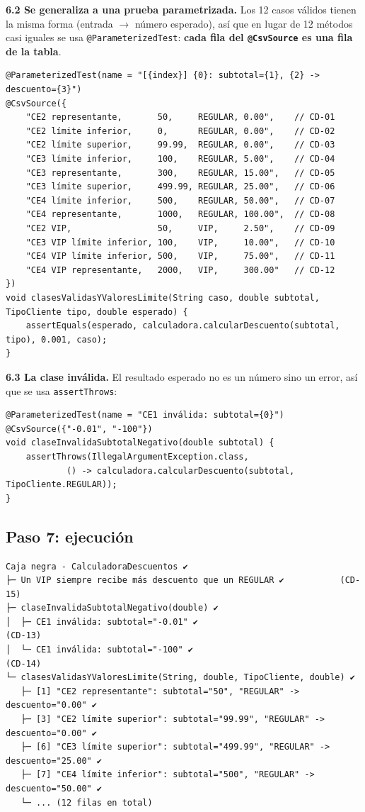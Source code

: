 \documentclass[11pt,a4paper,oneside]{report}
\newcommand{\code}[1]{\texttt{#1}}
\begin{document}
\textbf{6.2 Se generaliza a una prueba parametrizada.} Los 12 casos válidos tienen la misma forma (entrada $\rightarrow$ número esperado), así que en lugar de 12 métodos casi iguales se usa \code{@ParameterizedTest}: \textbf{cada fila del \code{@CsvSource} es una fila de la tabla}.
\begin{lstlisting}[caption={Clases válidas y límites (\code{CalculadoraDescuentosCajaNegraTest})}]
@ParameterizedTest(name = "[{index}] {0}: subtotal={1}, {2} -> descuento={3}")
@CsvSource({
    "CE2 representante,       50,     REGULAR, 0.00",    // CD-01
    "CE2 límite inferior,     0,      REGULAR, 0.00",    // CD-02
    "CE2 límite superior,     99.99,  REGULAR, 0.00",    // CD-03
    "CE3 límite inferior,     100,    REGULAR, 5.00",    // CD-04
    "CE3 representante,       300,    REGULAR, 15.00",   // CD-05
    "CE3 límite superior,     499.99, REGULAR, 25.00",   // CD-06
    "CE4 límite inferior,     500,    REGULAR, 50.00",   // CD-07
    "CE4 representante,       1000,   REGULAR, 100.00",  // CD-08
    "CE2 VIP,                 50,     VIP,     2.50",    // CD-09
    "CE3 VIP límite inferior, 100,    VIP,     10.00",   // CD-10
    "CE4 VIP límite inferior, 500,    VIP,     75.00",   // CD-11
    "CE4 VIP representante,   2000,   VIP,     300.00"   // CD-12
})
void clasesValidasYValoresLimite(String caso, double subtotal, TipoCliente tipo, double esperado) {
    assertEquals(esperado, calculadora.calcularDescuento(subtotal, tipo), 0.001, caso);
}
\end{lstlisting}

\textbf{6.3 La clase inválida.} El resultado esperado no es un número sino un error, así que se usa \code{assertThrows}:
\begin{lstlisting}[caption={Clase inválida CE1 (CD-13 y CD-14)}]
@ParameterizedTest(name = "CE1 inválida: subtotal={0}")
@CsvSource({"-0.01", "-100"})
void claseInvalidaSubtotalNegativo(double subtotal) {
    assertThrows(IllegalArgumentException.class,
            () -> calculadora.calcularDescuento(subtotal, TipoCliente.REGULAR));
}
\end{lstlisting}

\subsection{Paso 7: ejecución}
\begin{lstlisting}[style=bash,caption={Salida de la ejecución (extracto; los ID entre paréntesis son anotaciones nuestras)}]
Caja negra - CalculadoraDescuentos ✔
├─ Un VIP siempre recibe más descuento que un REGULAR ✔           (CD-15)
├─ claseInvalidaSubtotalNegativo(double) ✔
│  ├─ CE1 inválida: subtotal="-0.01" ✔                              (CD-13)
│  └─ CE1 inválida: subtotal="-100" ✔                               (CD-14)
└─ clasesValidasYValoresLimite(String, double, TipoCliente, double) ✔
   ├─ [1] "CE2 representante": subtotal="50", "REGULAR" -> descuento="0.00" ✔
   ├─ [3] "CE2 límite superior": subtotal="99.99", "REGULAR" -> descuento="0.00" ✔
   ├─ [6] "CE3 límite superior": subtotal="499.99", "REGULAR" -> descuento="25.00" ✔
   ├─ [7] "CE4 límite inferior": subtotal="500", "REGULAR" -> descuento="50.00" ✔
   └─ ... (12 filas en total)
\end{lstlisting}
\end{document}
